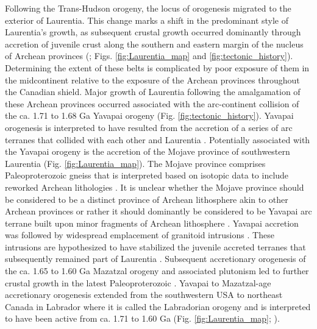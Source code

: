 \documentclass[twocolumn, switch]{article} %
\begin{document}
Following the Trans-Hudson orogeny, the locus of orogenesis migrated to the exterior of Laurentia. This change marks a shift in the predominant style of Laurentia's growth, as subsequent crustal growth occurred dominantly through accretion of juvenile crust along the southern and eastern margin of the nucleus of Archean provinces (\citealp{Whitmeyer2007a}; Figs. \ref{fig:Laurentia_map} and \ref{fig:tectonic_history}). Determining the extent of these belts is complicated by poor exposure of them in the midcontinent relative to the exposure of the Archean provinces throughout the Canadian shield. Major growth of Laurentia following the amalgamation of these Archean provinces occurred associated with the arc-continent collision of the ca. 1.71 to 1.68 Ga Yavapai orogeny (Fig. \ref{fig:tectonic_history}). Yavapai orogenesis is interpreted to have resulted from the accretion of a series of arc terranes that collided with each other and Laurentia \citep{Karlstrom2001a}. Potentially associated with the Yavapai orogeny is the accretion of the Mojave province of southwestern Laurentia (Fig. \ref{fig:Laurentia_map}). The Mojave province comprises Paleoproterozoic gneiss that is interpreted based on isotopic data to include reworked Archean lithologies \citep{Bennett1987a}. It is unclear whether the Mojave province should be considered to be a distinct province of Archean lithosphere akin to other Archean provinces or rather it should dominantly be considered to be Yavapai arc terrane built upon minor fragments of Archean lithosphere \citep{Whitmeyer2007a}. Yavapai accretion was followed by widespread emplacement of granitoid intrusions \citep{Whitmeyer2007a}. These intrusions are hypothesized to have stabilized the juvenile accreted terranes that subsequently remained part of Laurentia \citep{Whitmeyer2007a}. Subsequent accretionary orogenesis of the ca. 1.65 to 1.60 Ga Mazatzal orogeny and associated plutonism led to further crustal growth in the latest Paleoproterozoic \citep{Karlstrom1988a}. Yavapai to Mazatzal-age accretionary orogenesis extended from the southwestern USA to northeast Canada in Labrador where it is called the Labradorian orogeny and is interpreted to have been active from ca. 1.71 to 1.60 Ga (Fig. \ref{fig:Laurentia_map}; \citealp{Gower1992a, Gower2008b}). 
\end{document}
